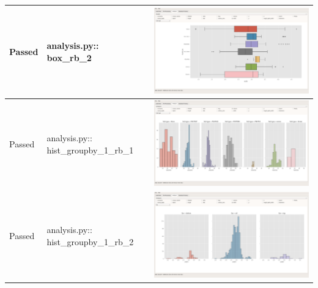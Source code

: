 \documentclass[11pt]{report}
\begin{document}
\begin{longtable}{|l|p{6.5cm}|C|}
\hline
\color{ForestGreen}Passed & analysis.py:: box\_rb\_2 & \includegraphics[width=.9\linewidth]{./images/Screenshots/analysis_window_box_rb_2.png}\\
\hline
\color{ForestGreen}Passed & analysis.py:: hist\_groupby\_1\_rb\_1 & \includegraphics[width=.9\linewidth]{./images/Screenshots/analysis_window_hist_groupby_1_rb_1.png}\\
\hline
\color{ForestGreen}Passed & analysis.py:: hist\_groupby\_1\_rb\_2 & \includegraphics[width=.9\linewidth]{./images/Screenshots/analysis_window_hist_groupby_1_rb_2.png}\\
\hline

\end{longtable}
\end{document}
